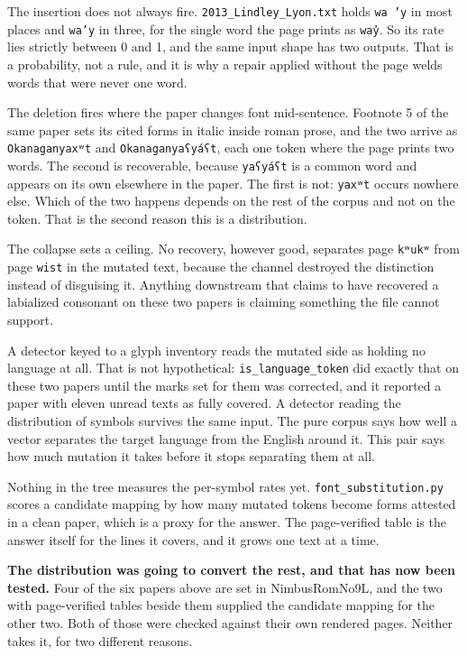 The insertion does not always fire. \texttt{2013\_\allowbreak{}Lindley\_\allowbreak{}Lyon.\allowbreak{}txt} holds \texttt{wa ’y} in most places and \texttt{wa’y} in three, for the single word the page prints as \texttt{way̓}. So its rate lies strictly between 0 and 1, and the same input shape has two outputs. That is a probability, not a rule, and it is why a repair applied without the page welds words that were never one word.

The deletion fires where the paper changes font mid-sentence. Footnote 5 of the same paper sets its cited forms in italic inside roman prose, and the two arrive as \texttt{Okanaganyaxʷt} and \texttt{Okanaganyaʕyáʕt}, each one token where the page prints two words. The second is recoverable, because \texttt{yaʕyáʕt} is a common word and appears on its own elsewhere in the paper. The first is not: \texttt{yaxʷt} occurs nowhere else. Which of the two happens depends on the rest of the corpus and not on the token. That is the second reason this is a distribution.

The collapse sets a ceiling. No recovery, however good, separates page \texttt{kʷukʷ} from page \texttt{wist} in the mutated text, because the channel destroyed the distinction instead of disguising it. Anything downstream that claims to have recovered a labialized consonant on these two papers is claiming something the file cannot support.

A detector keyed to a glyph inventory reads the mutated side as holding no language at all. That is not hypothetical: \texttt{is\_\allowbreak{}language\_\allowbreak{}token} did exactly that on these two papers until the marks set for them was corrected, and it reported a paper with eleven unread texts as fully covered. A detector reading the distribution of symbols survives the same input. The pure corpus says how well a vector separates the target language from the English around it. This pair says how much mutation it takes before it stops separating them at all.

Nothing in the tree measures the per-symbol rates yet. \texttt{font\_\allowbreak{}substitution.\allowbreak{}py} scores a candidate mapping by how many mutated tokens become forms attested in a clean paper, which is a proxy for the answer. The page-verified table is the answer itself for the lines it covers, and it grows one text at a time.

\textbf{The distribution was going to convert the rest, and that has now been tested.} Four of the six papers above are set in NimbusRomNo9L, and the two with page-verified tables beside them supplied the candidate mapping for the other two. Both of those were checked against their own rendered pages. Neither takes it, for two different reasons.

